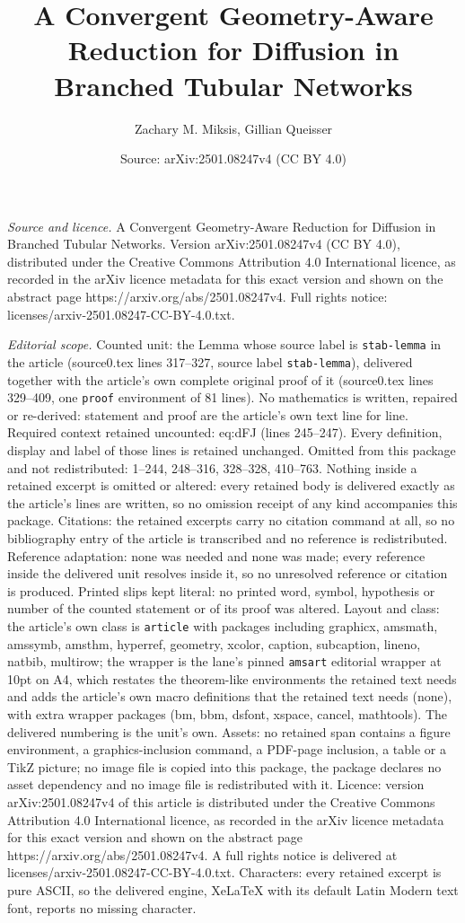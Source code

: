 \documentclass[10pt,a4paper]{amsart}
\title[A Convergent Geometry-Aware Reduction for Diffusion in Branc]{A Convergent Geometry-Aware Reduction for Diffusion in Branched Tubular Networks}
\author{Zachary M. Miksis, Gillian Queisser}
\date{Source: arXiv:2501.08247v4 (CC BY 4.0)}
\begin{document}
\maketitle

\noindent\emph{Source and licence.} A Convergent Geometry-Aware Reduction for Diffusion in Branched Tubular Networks. Version arXiv:2501.08247v4 (CC BY 4.0), distributed under the Creative Commons Attribution 4.0 International licence, as recorded in the arXiv licence metadata for this exact version and shown on the abstract page https://arxiv.org/abs/2501.08247v4. Full rights notice: licenses/arxiv-2501.08247-CC-BY-4.0.txt.\par\smallskip

\noindent\textit{Editorial scope.} Counted unit: the Lemma whose source label is \texttt{stab-lemma} in the article (source0.tex lines 317--327, source label \texttt{stab-lemma}), delivered together with the article's own complete original proof of it (source0.tex lines 329--409, one \texttt{proof} environment of 81 lines). No mathematics is written, repaired or re-derived: statement and proof are the article's own text line for line. Required context retained uncounted: eq:dFJ (lines 245--247). Every definition, display and label of those lines is retained unchanged. Omitted from this package and not redistributed: 1--244, 248--316, 328--328, 410--763. Nothing inside a retained excerpt is omitted or altered: every retained body is delivered exactly as the article's lines are written, so no omission receipt of any kind accompanies this package. Citations: the retained excerpts carry no citation command at all, so no bibliography entry of the article is transcribed and no reference is redistributed. Reference adaptation: none was needed and none was made; every reference inside the delivered unit resolves inside it, so no unresolved reference or citation is produced. Printed slips kept literal: no printed word, symbol, hypothesis or number of the counted statement or of its proof was altered. Layout and class: the article's own class is \texttt{article} with packages including graphicx, amsmath, amssymb, amsthm, hyperref, geometry, xcolor, caption, subcaption, lineno, natbib, multirow; the wrapper is the lane's pinned \texttt{amsart} editorial wrapper at 10pt on A4, which restates the theorem-like environments the retained text needs and adds the article's own macro definitions that the retained text needs (none), with extra wrapper packages (bm, bbm, dsfont, xspace, cancel, mathtools). The delivered numbering is the unit's own. Assets: no retained span contains a figure environment, a graphics-inclusion command, a PDF-page inclusion, a table or a TikZ picture; no image file is copied into this package, the package declares no asset dependency and no image file is redistributed with it. Licence: version arXiv:2501.08247v4 of this article is distributed under the Creative Commons Attribution 4.0 International licence, as recorded in the arXiv licence metadata for this exact version and shown on the abstract page https://arxiv.org/abs/2501.08247v4. A full rights notice is delivered at licenses/arxiv-2501.08247-CC-BY-4.0.txt. Characters: every retained excerpt is pure ASCII, so the delivered engine, XeLaTeX with its default Latin Modern text font, reports no missing character.
\end{document}
